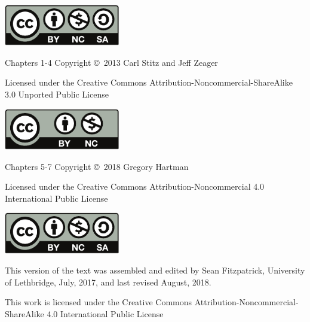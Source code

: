 \noindent\hskip -1in\begin{minipage}{2.2in}
\begin{center}
\includegraphics[width=2in]{figures/license}
\end{center}
\end{minipage}
\begin{minipage}{3.3in}
Chapters 1-4 Copyright \copyright\ 2013 Carl Stitz and Jeff Zeager

Licensed under the Creative Commons Attribution-Noncommercial-ShareAlike 3.0 Unported Public License
\end{minipage}

\bigskip

\bigskip

\bigskip


\noindent\hskip-1in\begin{minipage}{2.2in}
\begin{center}
\includegraphics[width=2in]{text/by-nc} 
\end{center}
\end{minipage}
\begin{minipage}{3.3in}
Chapters 5-7 Copyright \copyright\ 2018 Gregory Hartman

Licensed under the Creative Commons Attribution-Noncommercial 4.0 International Public License
\end{minipage}

\bigskip

\bigskip

\bigskip

\noindent\hskip-1in\begin{minipage}{2.2in}
\begin{center}
\includegraphics[width=2in]{figures/license}
\end{center}
\end{minipage}
\begin{minipage}{3.3in}
This version of the text was assembled and edited by Sean Fitzpatrick, University of Lethbridge, July, 2017, and last revised August, 2018.

This work is licensed under the Creative Commons Attribution-Noncommercial-ShareAlike 4.0 International Public License
\end{minipage}
